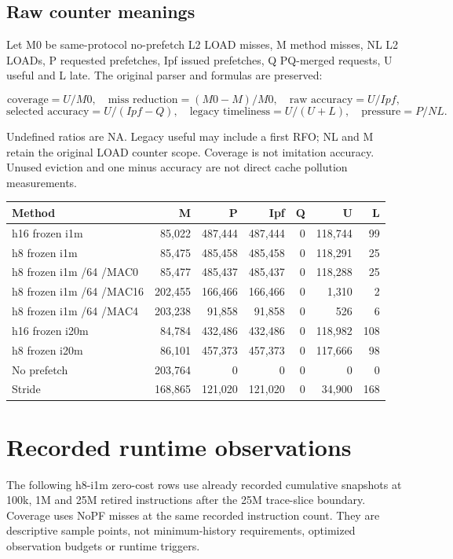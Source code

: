 \documentclass[10pt]{article}
\begin{document}
\subsection{Raw counter meanings}

Let M0 be same-protocol no-prefetch L2 LOAD misses, M method misses, NL L2 LOADs, P requested prefetches, Ipf issued prefetches, Q PQ-merged requests, U useful and L late. The original parser and formulas are preserved:

\[\text{coverage}=U/M0,\quad\text{miss reduction}=(M0-M)/M0,\quad\text{raw accuracy}=U/Ipf,\]\[\text{selected accuracy}=U/(Ipf-Q),\quad\text{legacy timeliness}=U/(U+L),\quad\text{pressure}=P/NL.\]

Undefined ratios are NA. Legacy useful may include a first RFO; NL and M retain the original LOAD counter scope. Coverage is not imitation accuracy. Unused eviction and one minus accuracy are not direct cache pollution measurements.

\begin{center}
\scriptsize
\begin{tabular}{lrrrrrr}
\toprule
Method & M & P & Ipf & Q & U & L \\
\midrule
h16 frozen i1m & 85,022 & 487,444 & 487,444 & 0 & 118,744 & 99 \\
h8 frozen i1m & 85,475 & 485,458 & 485,458 & 0 & 118,291 & 25 \\
h8 frozen i1m /64 /MAC0 & 85,477 & 485,437 & 485,437 & 0 & 118,288 & 25 \\
h8 frozen i1m /64 /MAC16 & 202,455 & 166,466 & 166,466 & 0 & 1,310 & 2 \\
h8 frozen i1m /64 /MAC4 & 203,238 & 91,858 & 91,858 & 0 & 526 & 6 \\
h16 frozen i20m & 84,784 & 432,486 & 432,486 & 0 & 118,982 & 108 \\
h8 frozen i20m & 86,101 & 457,373 & 457,373 & 0 & 117,666 & 98 \\
No prefetch & 203,764 & 0 & 0 & 0 & 0 & 0 \\
Stride & 168,865 & 121,020 & 121,020 & 0 & 34,900 & 168 \\
\bottomrule
\end{tabular}
\end{center}

\clearpage\section{Recorded runtime observations}

The following h8-i1m zero-cost rows use already recorded cumulative snapshots at 100k, 1M and 25M retired instructions after the 25M trace-slice boundary. Coverage uses NoPF misses at the same recorded instruction count. They are descriptive sample points, not minimum-history requirements, optimized observation budgets or runtime triggers.
\end{document}

